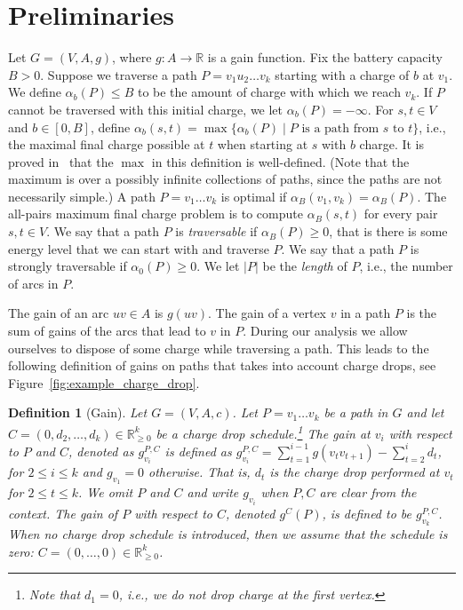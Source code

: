 \documentclass[11pt]{article}
\newtheorem{definition}[theorem]{Definition}
\newcommand{\RR}{\mathbb{R}}
\begin{document}
\section{Preliminaries}\label{S:prelim}

Let $G=(V,A,g)$, where $g:A\to\RR$ is a gain function.
Fix the battery capacity $B> 0 $.
Suppose we traverse a path
$P=v_1 u_2\ldots v_k$ 
starting with a charge of $b$ at $v_1$. We define
$\alpha_b(P)\le B$ to be the amount of charge with which we reach $v_k$. If $P$ cannot be traversed with this initial charge, we let $\alpha_b(P) = -\infty$. For $s,t\in V$ and $b\in [0,B]$, define $\alpha_b(s,t)=\max \{ \alpha_b(P) \mid \text{$P$ is a path from $s$ to $t$}\}$, i.e., the maximal final charge possible at $t$ when starting at $s$ with  $b$ charge. It is proved in~\cite{DorfmanKTZ23} that the $\max$ in this definition is well-defined. (Note that the maximum is over a possibly infinite collections of paths, since the paths are not necessarily simple.) A path $P=v_1\ldots v_k$ is optimal if $\alpha_B(v_1,v_k)=\alpha_B(P)$. The all-pairs maximum final charge problem is to compute $\alpha_B(s,t)$ for every pair $s,t\in V$. We say that a path $P$ is \emph{traversable} if $\alpha_B(P)\ge 0$, that is there is some energy level  that we can start with and traverse $P$. We say that a path $P$ is strongly traversable if $\alpha_0(P)\ge 0$. We let $|P|$ be the \emph{length} of $P$, i.e., the number of arcs in $P$.

The gain of an arc $uv\in A$ is $g(uv)$. The gain of a vertex $v$ in a path $P$ is the sum of gains of the arcs  that lead to $v$ in $P$. During our analysis we allow ourselves to dispose of some charge while traversing a path. This leads to the following definition of gains on paths that takes into account charge drops, see Figure~\ref{fig:example_charge_drop}.

\begin{definition}[Gain]\label{def:gain}
    Let $G=(V,A,c)$. Let $P=v_1\ldots v_k$ be a path in $G$ and let $C=(0,d_2,\ldots, d_k)\in \RR^k_{\ge 0}$   be a charge drop schedule.\footnote{Note that $d_1=0$, i.e., we do not drop charge at the first vertex.} The \emph{gain} at $v_i$ with respect to $P$ and $C$, denoted as $g^{P,C}_{v_i}$ is defined as $g_{v_i}^{P,C} =\sum_{t=1}^{i-1} g(v_{t} v_{t+1}) - \sum_{t=2}^{i} d_t$, for $2\le i\le k$ and $g_{v_1} = 0$ otherwise. That is, $d_t$ is the charge drop performed at $v_t$ for $2\le t \le k$. 
    We omit $P$ and $C$ and write $g_{v_i}$ when $P,C$ are clear from the context. The gain of $P$ with respect to $C$, denoted $g^C(P)$, is defined to be $g^{P,C}_{v_k}$. When no charge drop schedule is introduced, then we assume that the schedule is zero: $C = (0,\ldots,0) \in \RR^k_{\ge 0}$. 
\end{definition}
\end{document}
